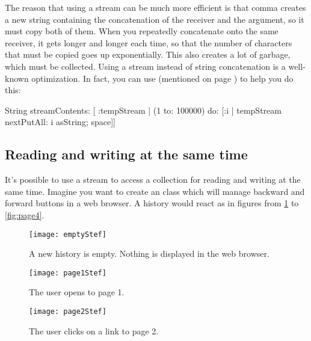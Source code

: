 \documentclass[a4paper,10pt,twoside]{book}
\begin{document}
The reason that using a stream can be much more efficient is that 
comma creates a new string containing
the concatenation of the receiver and the argument, so it must copy both of them.
When you repeatedly concatenate onto the same receiver, it gets longer and longer each time,
so that the number of characters that must be copied goes up exponentially.
This also creates a lot of garbage, which must be collected. Using
a stream instead of string concatenation is a well-known optimization.
In fact, you can use  (mentioned on page \pageref{sec:streamContents}) to help you do this:

\begin{code}{}
String streamContents: [ :tempStream |
  (1 to: 100000)
       do: [:i | tempStream nextPutAll: i asString; space]] 
\end{code}

\subsection{Reading and writing at the same time}

It's possible to use a stream to access a collection for reading and
writing at the same time.
Imagine you want to create an  class which will manage
backward and forward buttons in a web browser.
A history would react as in figures from \ref{fig:emptyStream} to
\ref{fig:page4}.

\begin{figure}[!ht]
\centerline{\texttt{[image: emptyStef]}}
\caption{A new history is empty. Nothing is displayed in the web browser.}
\label{fig:emptyStream}
\vspace{.2in}
\end{figure}

\begin{figure}[!ht]
\centerline{\texttt{[image: page1Stef]}}
\caption{The user opens to page 1.}
\label{fig:page1}
\vspace{.2in}
\end{figure}

\begin{figure}[!ht]
\centerline{\texttt{[image: page2Stef]}}
\caption{The user clicks on a link to page 2.}
\label{fig:page2}
\vspace{.2in}
\end{figure}
\end{document}
